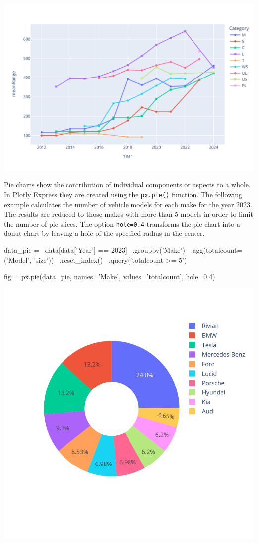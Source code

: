 \begin{center}
  \includegraphics[width=.8\textwidth]{px.fuel.linesPoints.pdf}
\end{center}

Pie charts show the contribution of individual components or aspects to a whole. In Plotly Express they are created using the \texttt{px.pie()} function. The following example calculates the number of vehicle models for each make for the year 2023. The results are reduced to those makes with more than 5 models in order to limit the number of pie slices. The option \texttt{hole=0.4} transforms the pie chart into a donut chart by leaving a hole of the specified radius in the center.

\begin{samepage}
\begin{pythoncode}
data_pie = \
  data[data['Year'] == 2023] \
    .groupby('Make') \
    .agg(totalcount=('Model', 'size')) \
    .reset_index() \
    .query('totalcount >= 5')

fig = px.pie(data_pie, 
             names='Make', values='totalcount', 
             hole=0.4)
\end{pythoncode}
\end{samepage}

\begin{center}
  \includegraphics[width=.6\textwidth]{px.fuel.pie.pdf}
\end{center}

